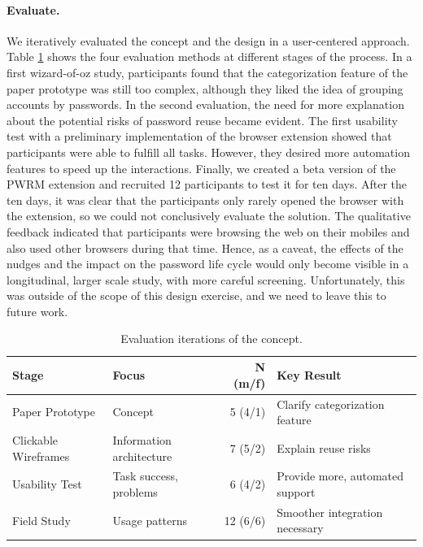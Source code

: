 \paragraph{Evaluate.} 
We iteratively evaluated the concept and the design in a user-centered approach. Table \ref{tab:pwrm:evaluations} shows the four evaluation methods at different stages of the process. In a first wizard-of-oz study, participants found that the categorization feature of the paper prototype was still too complex, although they liked the idea of grouping accounts by passwords. In the second evaluation, the need for more explanation about the potential risks of password reuse became evident. The first usability test with a preliminary implementation of the browser extension showed that participants were able to fulfill all tasks. However, they desired more automation features to speed up the interactions. Finally, we created a beta version of the PWRM extension and recruited 12 participants to test it for ten days. After the ten days, it was clear that the participants only rarely opened the browser with the extension, so we could not conclusively evaluate the solution. The qualitative feedback indicated that participants were browsing the web on their mobiles and also used other browsers during that time. Hence, as a caveat, the effects of the nudges and the impact on the password life cycle would only become visible in a longitudinal, larger scale study, with more careful screening. Unfortunately, this was outside of the scope of this design exercise, and we need to leave this to future work. 

\begin{table}
	\begin{tabular}{llrp{9cm}}
		\textbf{Stage} & \textbf{Focus} & \textbf{N} (m/f) & \textbf{Key Result}\\ \hline
		Paper Prototype & Concept & 5 (4/1) & Clarify categorization feature \\
		Clickable Wireframes & Information architecture & 7 (5/2) & Explain reuse risks \\
		Usability Test & Task success, problems & 6 (4/2) & Provide more, automated support \\
		Field Study & Usage patterns & 12 (6/6) & Smoother integration necessary
	\end{tabular}
	\caption{\label{tab:pwrm:evaluations} Evaluation iterations of the concept. }
\end{table}

